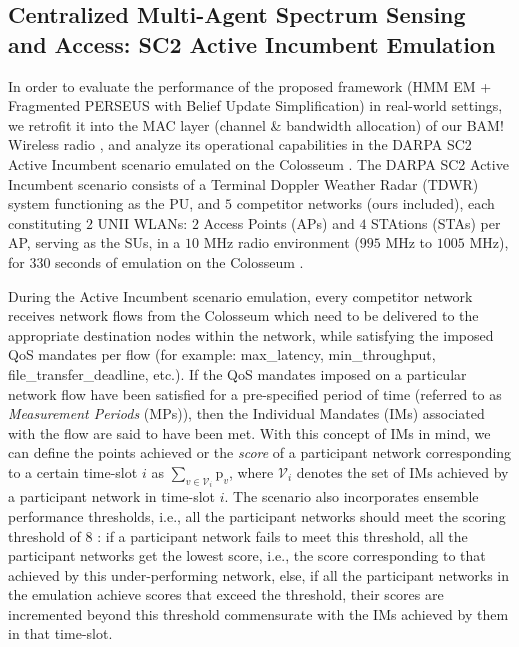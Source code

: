 \documentclass[10pt, twocolumn]{IEEEtran}
\begin{document}
\subsection{Centralized Multi-Agent Spectrum Sensing and Access: SC2 Active Incumbent Emulation}\label{Y}
In order to evaluate the performance of the proposed framework (HMM EM + Fragmented PERSEUS with Belief Update Simplification) in real-world settings, we retrofit it into the MAC layer (channel \& bandwidth allocation) of our BAM! Wireless radio \cite{BAM}, and analyze its operational capabilities in the DARPA SC2 Active Incumbent scenario \cite{DARPA:ActiveIncumbent} emulated on the Colosseum \cite{DARPA:SC2c2api, DARPA:SC2scenarios}. The DARPA SC2 Active Incumbent scenario consists of a Terminal Doppler Weather Radar (TDWR) system functioning as the PU, and $5$ competitor networks (ours included), each constituting $2$ UNII WLANs: $2$ Access Points (APs) and $4$ STAtions (STAs) per AP, serving as the SUs, in a $10$ MHz radio environment ($995$ MHz to $1005$ MHz), for $330$ seconds of emulation on the Colosseum \cite{DARPA:ActiveIncumbent}.

During the Active Incumbent scenario emulation, every competitor network receives network flows from the Colosseum which need to be delivered to the appropriate destination nodes within the network, while satisfying the imposed QoS mandates per flow (for example: max\_latency, min\_throughput, file\_transfer\_deadline, etc.). If the QoS mandates imposed on a particular network flow have been satisfied for a pre-specified period of time (referred to as \emph{Measurement Periods} (MPs)), then the Individual Mandates (IMs) associated with the flow are said to have been met. With this concept of IMs in mind, we can define the points achieved or the \emph{score} of a participant network corresponding to a certain time-slot $i$ as $\sum_{v{\in}\mathcal{V}_{i}} \text{p}_{v}$, where $\mathcal{V}_{i}$ denotes the set of IMs achieved by a participant network in time-slot $i$. The scenario also incorporates ensemble performance thresholds, i.e., all the participant networks should meet the scoring threshold of $8$ \cite{DARPA:ActiveIncumbent}: if a participant network fails to meet this threshold, all the participant networks get the lowest score, i.e., the score corresponding to that achieved by this under-performing network, else, if all the participant networks in the emulation achieve scores that exceed the threshold, their scores are incremented beyond this threshold commensurate with the IMs achieved by them in that time-slot.
\end{document}
